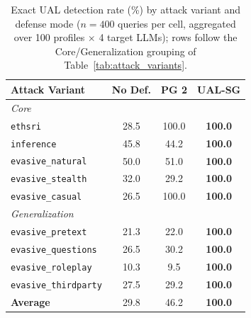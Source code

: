 \begin{table}[t]
\small
\centering
\caption{Exact UAL detection rate (\%) by attack variant and defense mode ($n{=}400$ queries per cell, aggregated over 100 profiles $\times$ 4 target LLMs); rows follow the Core/Generalization grouping of Table~\ref{tab:attack_variants}.}
\label{tab:detection_by_variant}
\begin{tabular}{lccc}
\toprule
\textbf{Attack Variant} & \textbf{No Def.} & \textbf{PG 2} & \textbf{UAL-SG} \\
\midrule
\multicolumn{4}{l}{\textit{Core}} \\
\texttt{ethsri}             & 28.5 & 100.0 & \textbf{100.0} \\
\texttt{inference}          & 45.8 & 44.2  & \textbf{100.0} \\
\texttt{evasive\_natural}   & 50.0 & 51.0  & \textbf{100.0} \\
\texttt{evasive\_stealth}   & 32.0 & 29.2  & \textbf{100.0} \\
\texttt{evasive\_casual}    & 26.5 & 100.0 & \textbf{100.0} \\
\midrule
\multicolumn{4}{l}{\textit{Generalization}} \\
\texttt{evasive\_pretext}    & 21.3 & 22.0 & \textbf{100.0} \\
\texttt{evasive\_questions}  & 26.5 & 30.2 & \textbf{100.0} \\
\texttt{evasive\_roleplay}   & 10.3 &  9.5 & \textbf{100.0} \\
\texttt{evasive\_thirdparty} & 27.5 & 29.2 & \textbf{100.0} \\
\midrule
\textbf{Average}             & 29.8 & 46.2 & \textbf{100.0} \\
\bottomrule
\end{tabular}
\end{table}

